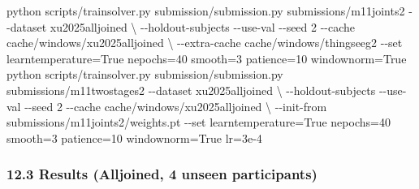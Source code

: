 \documentclass[
  11pt,
]{article}
\newenvironment{Shaded}{\begin{snugshade}}{\end{snugshade}}
\newcommand{\AttributeTok}[1]{\textcolor[rgb]{0.13,0.29,0.53}{#1}}
\newcommand{\DataTypeTok}[1]{\textcolor[rgb]{0.13,0.29,0.53}{#1}}
\newcommand{\ExtensionTok}[1]{#1}
\newcommand{\NormalTok}[1]{#1}
\renewcommand{\_}{\oldunderscore\allowbreak}
\begin{document}
\begin{Shaded}
\begin{Highlighting}[]
\ExtensionTok{python}\NormalTok{ scripts/train\_solver.py submission/submission.py submissions/m11\_joint\_s2 }\AttributeTok{{-}{-}dataset}\NormalTok{ xu2025alljoined }\DataTypeTok{\textbackslash{}}
  \AttributeTok{{-}{-}holdout{-}subjects} \AttributeTok{{-}{-}use{-}val} \AttributeTok{{-}{-}seed}\NormalTok{ 2 }\AttributeTok{{-}{-}cache}\NormalTok{ cache/windows/xu2025alljoined }\DataTypeTok{\textbackslash{}}
  \AttributeTok{{-}{-}extra{-}cache}\NormalTok{ cache/windows/things\_eeg2 }\AttributeTok{{-}{-}set}\NormalTok{ learn\_temperature=True n\_epochs=40 smooth=3 patience=10 window\_norm=True}
\ExtensionTok{python}\NormalTok{ scripts/train\_solver.py submission/submission.py submissions/m11\_twostage\_s2 }\AttributeTok{{-}{-}dataset}\NormalTok{ xu2025alljoined }\DataTypeTok{\textbackslash{}}
  \AttributeTok{{-}{-}holdout{-}subjects} \AttributeTok{{-}{-}use{-}val} \AttributeTok{{-}{-}seed}\NormalTok{ 2 }\AttributeTok{{-}{-}cache}\NormalTok{ cache/windows/xu2025alljoined }\DataTypeTok{\textbackslash{}}
  \AttributeTok{{-}{-}init{-}from}\NormalTok{ submissions/m11\_joint\_s2/weights.pt }\AttributeTok{{-}{-}set}\NormalTok{ learn\_temperature=True n\_epochs=40 smooth=3 patience=10 window\_norm=True lr=3e{-}4}
\end{Highlighting}
\end{Shaded}

\subsubsection{12.3 Results (Alljoined,
4 unseen
participants)}\label{results-alljoined-4-unseen-participants}
\end{document}

